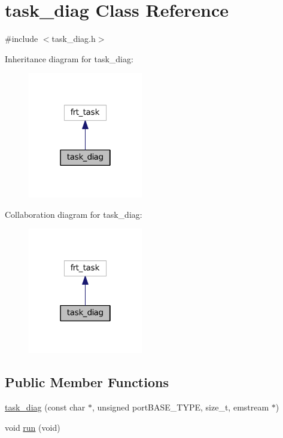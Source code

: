 \hypertarget{classtask__diag}{}\section{task\+\_\+diag Class Reference}
\label{classtask__diag}


{\ttfamily \#include $<$task\+\_\+diag.\+h$>$}



Inheritance diagram for task\+\_\+diag\+:
\nopagebreak
\begin{figure}[H]
\begin{center}
\leavevmode
\includegraphics[width=142pt]{classtask__diag__inherit__graph}
\end{center}
\end{figure}


Collaboration diagram for task\+\_\+diag\+:
\nopagebreak
\begin{figure}[H]
\begin{center}
\leavevmode
\includegraphics[width=142pt]{classtask__diag__coll__graph}
\end{center}
\end{figure}
\subsection*{Public Member Functions}
\begin{DoxyCompactItemize}
\item 
\mbox{\hyperlink{classtask__diag_ab6168448b8f36d11daac6b45b3c8b095}{task\+\_\+diag}} (const char $\ast$, unsigned port\+B\+A\+S\+E\+\_\+\+T\+Y\+PE, size\+\_\+t, emstream $\ast$)
\item 
void \mbox{\hyperlink{classtask__diag_a072201c00e01a8ed06b8e6a5effffd10}{run}} (void)
\end{DoxyCompactItemize}


